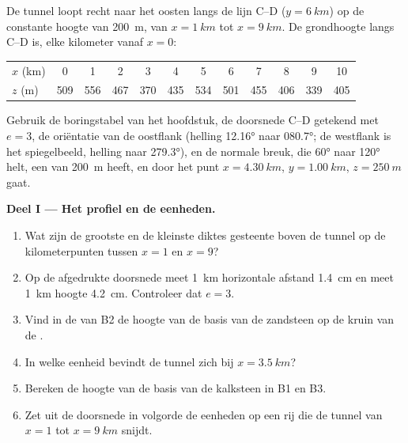 \begin{problem}
\label{pb:b1:cross-sections:1}
De tunnel loopt recht naar het oosten langs de lijn C--D ($y = \qty{6}{km}$) op de constante hoogte van \qty{200}{m},
van $x = \qty{1}{km}$ tot $x =
\qty{9}{km}$. De grondhoogte langs C--D is, elke kilometer vanaf $x = 0$:
\begin{center}
\small
\begin{tabular}{lccccccccccc}
\hline
$x$ (km) & 0 & 1 & 2 & 3 & 4 & 5 & 6 & 7 & 8 & 9 & 10 \\
$z$ (m) & 509 & 556 & 467 & 370 & 435 & 534 & 501 & 455 & 406 & 339 & 405 \\
\hline
\end{tabular}
\end{center}
Gebruik de boringstabel van het hoofdstuk, de doorsnede C--D getekend met $e = 3$, de oriëntatie van de oostflank
(helling \ang{12.16} naar \ang{080.7}; de westflank is het spiegelbeeld, helling naar \ang{279.3}), en de normale breuk,
die \ang{60} naar \ang{120} helt, een  van \qty{200}{m} heeft, en door het punt
$x = \qty{4.30}{km}$, $y = \qty{1.00}{km}$, $z = \qty{250}{m}$ gaat.

\medskip
\noindent\textbf{Deel I --- Het profiel en de eenheden.}
\begin{enumerate}
  \item Wat zijn de grootste en de kleinste diktes gesteente boven de tunnel op de kilometerpunten tussen
        $x = 1$ en $x = 9$?
  \item Op de afgedrukte doorsnede meet \qty{1}{km} horizontale afstand \qty{1.4}{cm} en meet \qty{1}{km} hoogte
        \qty{4.2}{cm}. Controleer dat $e = 3$.
  \item Vind in de  van B2 de hoogte van de basis van de zandsteen op de kruin van de .
  \item In welke eenheid bevindt de tunnel zich bij $x = \qty{3.5}{km}$?
  \item Bereken de hoogte van de basis van de kalksteen in B1 en B3.
  \item Zet uit de doorsnede in volgorde de eenheden op een rij die de tunnel van $x = 1$ tot $x = \qty{9}{km}$ snijdt.
\end{enumerate}


\end{problem}

